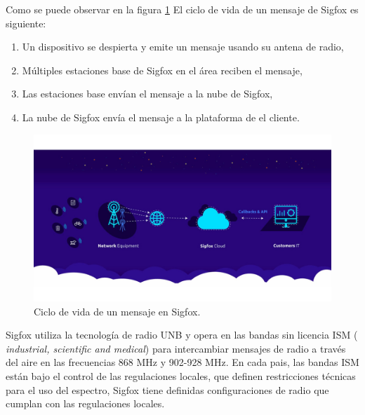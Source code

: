 Como se puede observar en la figura \ref{fig:SigfoxOverview} El ciclo de vida de un mensaje de Sigfox es siguiente:
\begin{enumerate}
    \item Un dispositivo se despierta y emite un mensaje usando su antena de radio,
    \item Múltiples estaciones base de Sigfox en el área reciben el mensaje,
    \item Las estaciones base envían el mensaje a la nube de Sigfox,
    \item La nube de Sigfox envía el mensaje a la plataforma de el cliente.
\end{enumerate}

\begin{figure}[h]
	\centering
	\includegraphics[scale=.25]{./Figures/SigfoxOverview.jpg}
	\caption{Ciclo de vida de un mensaje en Sigfox.}
	\label{fig:SigfoxOverview}
\end{figure}


Sigfox utiliza la tecnología de radio UNB y opera en las bandas sin licencia ISM (\textit{ industrial, scientific and medical}) para intercambiar mensajes de radio a través del aire en las frecuencias 868 MHz y 902-928 MHz. En cada pais, las  bandas ISM están bajo el control de las regulaciones locales, que definen restricciones técnicas para el uso del espectro, Sigfox tiene definidas configuraciones de radio que cumplan con las regulaciones locales.


